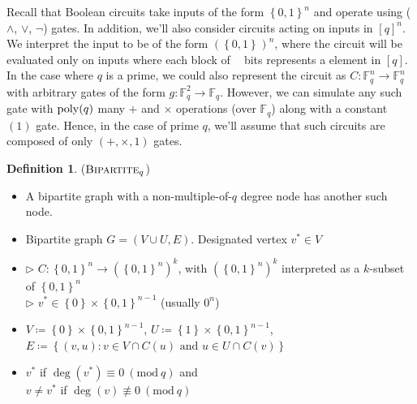 \documentclass[10pt,a4paper]{article}
\theoremstyle{definition}
\newtheorem{definition}[theorem]{Definition}
\theoremstyle{remark}
\newcommand{\contour}[2]{#2}
\newcommand{\inparen}[1]{\left ( #1 \right )}
\renewcommand{\mod}[1]{~\inparen{\mathrm{mod}~#1}}
\def\ceil#1{\mathop{\left\lceil#1\right\rceil}}
\def\set#1{\left\{#1\right\}}
\newcommand{\bbF}{\ensuremath{\mathbb{F}}}
\newcommand{\bit}{\ensuremath{\set{0,1}}}
\DeclareMathOperator*{\poly}{\ensuremath\mathrm{poly}}
\newcommand{\bipartite}{\ensuremath{\textsc{Bipartite}}}
\begin{document}
Recall that Boolean circuits take inputs of the form $\bit^n$ and operate using ($\wedge$, $\vee$, $\lnot$) gates. In addition, we'll also consider circuits acting on inputs in $[q]^n$. We interpret the input to be of the form $(\bit^{\ceil{\log q}})^n$, where the circuit will be evaluated only on inputs where each block of $\ceil{\log q}$ bits represents a element in $[q]$. In the case where $q$ is a prime, we could also represent the circuit as $C:\bbF_q^n \to \bbF_q^n$ with arbitrary gates of the form $g: \bbF_q^2 \to \bbF_q$. However, we can simulate any such gate with $\poly(q)$ many $+$ and $\times$ operations (over $\bbF_q$) along with a constant $(1)$ gate. Hence, in the case of prime $q$, we'll assume that such circuits are composed of only $(+, \times, 1)$ gates.\\[1mm]





\noindent
\begin{minipage}{\linewidth}
\begin{definition}
	\label{def:bipartite} \contour{black}{($\bipartite_q$)}\vspace{-5pt}
	\begin{itemize}[leftmargin=2.15cm,itemsep=4pt]
		\item[\slshape Principle:] A bipartite graph with a non-multiple-of-$q$ degree node has another such node.
		\item[\slshape Object:] Bipartite graph $G = (V \cup U, E)$. Designated vertex $v^* \in V$
		\item[\slshape Inputs:] $\triangleright$ $C:\bit^n \to (\bit^n)^k$, with $(\bit^n)^k$ interpreted as a $k$-subset of $\bit^n$\\
	$\triangleright$ $v^* \in \set{0}\times\bit^{n-1}$ (usually $0^n$)
		\item[\slshape Encoding:] $V\coloneqq\set{0}\times\bit^{n-1}$, $U\coloneqq\set{1}\times\bit^{n-1}$,\\
	$E \coloneqq \set{(v,u) : v \in V \cap C(u) \text{ and } u \in U \cap C(v)}$
		\item[\slshape Solutions:] $v^*$ if $\deg(v^*) \equiv 0 \mod{q}$ and\\
	$v \ne v^*$ if $\deg(v) \not\equiv 0 \mod{q}$
	\end{itemize}
\end{definition}
\end{minipage}\vspace{5mm}
\end{document}
